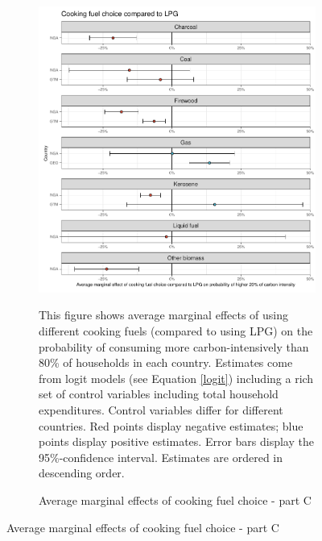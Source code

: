  \begin{figure}[ht!]\ContinuedFloat
   \centering
   \begin{subfigure}[b]{\textwidth}
   \centering
   \includegraphics{1_Figures/Analysis_Logit_Models_Marginal_Effects/Average_Marginal_Effects_affected_upper_80_CF_LPG_2017B.pdf}
   \caption{Average marginal effects of cooking fuel choice - part C} \label{fig:Logit_ME_CF_3}
   \begin{subcaption2}
     This figure shows average marginal effects of using different cooking fuels (compared to using LPG) on the probability of consuming more carbon-intensively than 80\% of households in each country. Estimates come from logit models (see Equation \ref{logit}) including a rich set of control variables including total household expenditures. Control variables differ for different countries. Red points display negative estimates; blue points display positive estimates. Error bars display the 95\%-confidence interval. Estimates are ordered in descending order.
   \end{subcaption2}
   \end{subfigure}
 \end{figure}
 \clearpage

